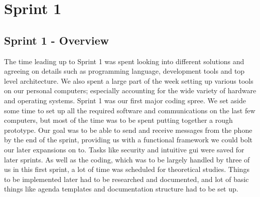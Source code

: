\chapter{Sprint 1}

\section{Sprint 1 - Overview}
The time leading up to Sprint 1 was spent looking into different solutions and agreeing on details such as programming language, development tools and top level architecture. We also spent a large part of the week setting up various tools on our personal computers; especially accounting for the wide variety of hardware and operating systems.
\newline
\newline
Sprint 1 was our first major coding spree. We set aside some time to set up all the required software and communications on the last few computers, but most of the time was to be spent putting together a rough prototype. Our goal was to be able to send and receive messages from the phone by the end of the sprint, providing us with a functional framework we could bolt our later expansions on to. Tasks like security and intuitive \gls{gui} were saved for later sprints.
\newline
\newline
As well as the coding, which was to be largely handled by three of us in this first sprint, a lot of time was scheduled for theoretical studies. Things to be implemented later had to be researched and documented, and lot of basic things like agenda templates and documentation structure had to be set up.